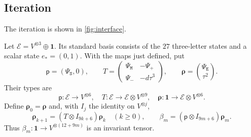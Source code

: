 \documentclass[a4paper,11pt]{amsart}
\newcommand{\one}{\mathbf1}
\newcommand{\wordstart}{\mathtt{S}}
\newcommand{\wordmiddle}{\mathtt{M}}
\newcommand{\wordend}{\mathtt{E}}
\newcommand{\startmap}{{\Psi}_{{\wordstart}}}
\newcommand{\middlemap}{{\Psi}_{{\wordmiddle}}}
\newcommand{\finishmap}{{\Psi}_{{\wordend}}}
\newcommand{\createmap}{{\Psi}_+}
\newcommand{\removemap}{{\Psi}_-}
\newcommand{\pp}{\mathsf p}
\newcommand{\tailmap}{\boldsymbol{\rho}}
\numberwithin{equation}{subsection}
\theoremstyle{plain}
\theoremstyle{definition}
\theoremstyle{remark}
\begin{document}
\subsection{Iteration}

The iteration is shown in \autoref{fig:interface}.

\begin{definition}\label{def:corrected}
Let $\mathcal E=V^{\otimes3}\oplus\one$. Its standard basis consists
of the $27$ three-letter states and a scalar state $e_*=(0,1)$.
With the maps just defined, put
\begin{equation}\label{eq:maps}
\pp=(\startmap,0),\qquad
T=\begin{pmatrix}\middlemap&-\createmap\\\removemap&-d\tau^3\end{pmatrix},\qquad
\tailmap=\binom{\finishmap}{\tau^2}.
\end{equation}
Their types are
\[
\pp:\mathcal E\to V^{\otimes6},\quad
T:\mathcal E\to\mathcal E\otimes V^{\otimes9},\quad
\tailmap:\one\to\mathcal E\otimes V^{\otimes6}.
\]
Define $\tailmap_0=\tailmap$ and, with $I_j$ the identity on $V^{\otimes j}$,
\begin{equation}\label{eq:iterate}
\tailmap_{k+1}=(T\otimes I_{9k+6})\tailmap_k\quad(k\ge0),
\qquad \beta_m=(\pp\otimes I_{9m+6})\tailmap_m.
\end{equation}
Thus $\beta_m:\one\to V^{\otimes(12+9m)}$ is an invariant tensor.
\end{definition}
\end{document}
